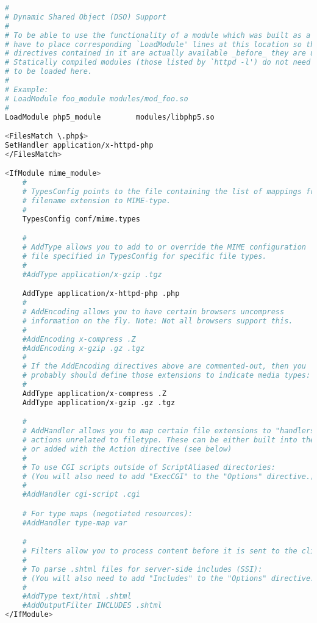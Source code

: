 \begin{lstlisting}[language=bash]
#
# Dynamic Shared Object (DSO) Support
#
# To be able to use the functionality of a module which was built as a DSO you
# have to place corresponding `LoadModule' lines at this location so the
# directives contained in it are actually available _before_ they are used.
# Statically compiled modules (those listed by `httpd -l') do not need
# to be loaded here.
#
# Example:
# LoadModule foo_module modules/mod_foo.so
#
LoadModule php5_module        modules/libphp5.so

<FilesMatch \.php$>
SetHandler application/x-httpd-php
</FilesMatch>

<IfModule mime_module>
    #
    # TypesConfig points to the file containing the list of mappings from
    # filename extension to MIME-type.
    #
    TypesConfig conf/mime.types

    #
    # AddType allows you to add to or override the MIME configuration
    # file specified in TypesConfig for specific file types.
    #
    #AddType application/x-gzip .tgz

    AddType application/x-httpd-php .php
    #
    # AddEncoding allows you to have certain browsers uncompress
    # information on the fly. Note: Not all browsers support this.
    #
    #AddEncoding x-compress .Z
    #AddEncoding x-gzip .gz .tgz
    #
    # If the AddEncoding directives above are commented-out, then you
    # probably should define those extensions to indicate media types:
    #
    AddType application/x-compress .Z
    AddType application/x-gzip .gz .tgz

    #
    # AddHandler allows you to map certain file extensions to "handlers":
    # actions unrelated to filetype. These can be either built into the server
    # or added with the Action directive (see below)
    #
    # To use CGI scripts outside of ScriptAliased directories:
    # (You will also need to add "ExecCGI" to the "Options" directive.)
    #
    #AddHandler cgi-script .cgi

    # For type maps (negotiated resources):
    #AddHandler type-map var

    #
    # Filters allow you to process content before it is sent to the client.
    #
    # To parse .shtml files for server-side includes (SSI):
    # (You will also need to add "Includes" to the "Options" directive.)
    #
    #AddType text/html .shtml
    #AddOutputFilter INCLUDES .shtml
</IfModule>
\end{lstlisting}


